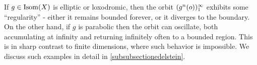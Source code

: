 \begin{remark}
If $g\in\operatorname{Isom}(X)$ is elliptic or loxodromic, then the orbit $(g^n(o))_1^\infty$ exhibits some ``regularity'' - either it remains bounded forever, or it diverges to the boundary. On the other hand, if $g$ is parabolic then the orbit can oscillate, both accumulating at infinity and returning infinitely often to a bounded region. This is in sharp contrast to finite dimensions, where such behavior is impossible. We discuss such examples in detail in \6\ref{subsubsectionedelstein}.
\end{remark}
%
%
%
%
%
%
%

